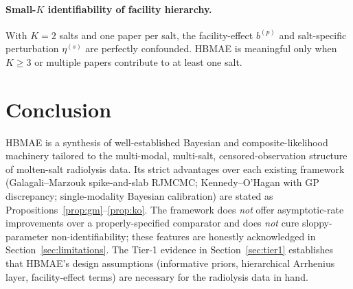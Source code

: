 \documentclass[11pt]{article}
\theoremstyle{definition}
\theoremstyle{remark}
\newcommand{\HBMAE}{HBMAE\xspace}
\begin{document}
\paragraph{Small-$K$ identifiability of facility hierarchy.}
With $K=2$ salts and one paper per salt, the facility-effect $b^{(p)}$ and salt-specific
perturbation $\eta^{(s)}$ are perfectly confounded. \HBMAE is meaningful only when $K\ge 3$
or multiple papers contribute to at least one salt.

\section{Conclusion}

\HBMAE is a synthesis of well-established Bayesian and composite-likelihood machinery
tailored to the multi-modal, multi-salt, censored-observation structure of molten-salt
radiolysis data. Its strict advantages over each existing framework (Galagali--Marzouk
spike-and-slab RJMCMC; Kennedy--O'Hagan with GP discrepancy; single-modality Bayesian
calibration) are stated as Propositions~\ref{prop:gm}--\ref{prop:ko}. The framework does
\emph{not} offer asymptotic-rate improvements over a properly-specified comparator and
does \emph{not} cure sloppy-parameter non-identifiability; these features are honestly
acknowledged in Section~\ref{sec:limitations}. The Tier-1 evidence in
Section~\ref{sec:tier1} establishes that \HBMAE's design assumptions (informative
priors, hierarchical Arrhenius layer, facility-effect terms) are necessary for the
radiolysis data in hand.



\end{document}
